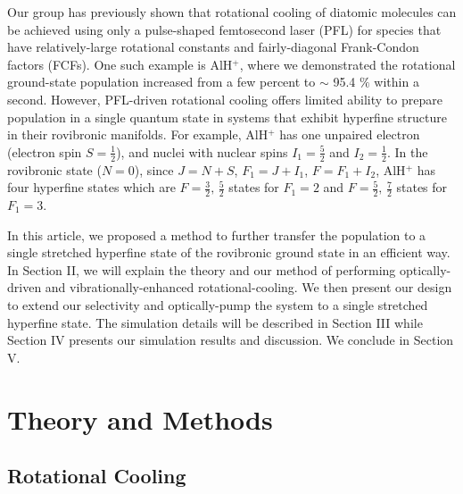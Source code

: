 \documentclass[nofootinbib,aip,jcp,reprint]{revtex4-1}
\begin{document}
Our group has previously shown that rotational cooling of diatomic molecules can be achieved using only a pulse-shaped femtosecond laser (PFL) for species that have relatively-large rotational constants and fairly-diagonal Frank-Condon factors (FCFs)\cite{lien2011optical}. One such example is AlH$^+$, where we demonstrated the rotational ground-state population increased from a few percent to $\sim$ 95.4 $\%$ within a second.\cite{lien2014broadband} However, PFL-driven rotational cooling offers limited ability to prepare population in a single quantum state in systems that exhibit hyperfine structure in their rovibronic manifolds. For example, AlH$^+$ has one unpaired electron (electron spin $S=\frac{1}{2}$), and nuclei with nuclear spins $I_{1}=\frac{5}{2}$ and $I_{2}=\frac{1}{2}$. In the rovibronic state ($N=0$), since $J=N+S$, $F_{1}=J+I_{1}$, $F=F_{1}+I_{2}$, AlH$^{+}$ has four hyperfine states which are $F=\frac{3}{2},\, \frac{5}{2}$ states for $F_{1}=2$ and $F=\frac{5}{2},\, \frac{7}{2}$ states for $F_{1}=3$.\par
In this article, we proposed a method to further transfer the population to a single stretched hyperfine state of the rovibronic ground state in an efficient way. In Section II, we will explain the theory and our method of performing optically-driven and vibrationally-enhanced rotational-cooling. We then present our design to extend our selectivity and optically-pump the system to a single stretched hyperfine state. The simulation details will be described in Section III while Section IV presents our simulation results and discussion. We conclude in Section V.\par


\section{Theory and Methods}
\subsection{Rotational Cooling}
\end{document}
